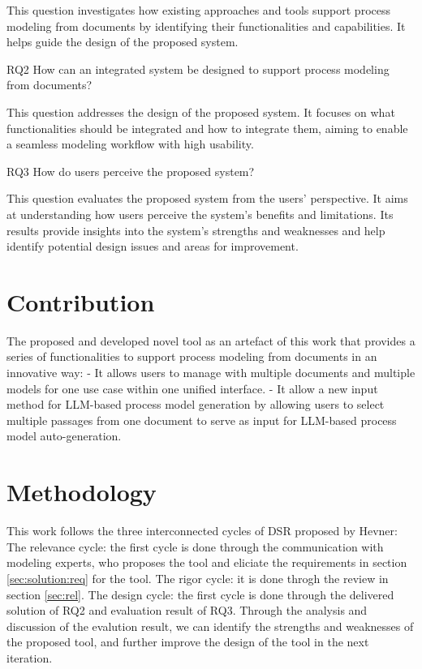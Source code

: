 This question investigates how existing approaches and tools support process modeling from documents by identifying their functionalities and capabilities. It helps guide the design of the proposed system.

RQ2 How can an integrated system be designed to support process modeling from documents?

This question addresses the design of the proposed system. It focuses on what functionalities should be integrated and how to integrate them, aiming to enable a seamless modeling workflow with high usability.

RQ3 How do users perceive the proposed system?

This question evaluates the proposed system from the users’ perspective. It aims at understanding how users perceive the system’s benefits and limitations. Its results provide insights into the system’s strengths and weaknesses and help identify potential design issues and areas for improvement.


\section{Contribution}
\label{sec:intro:con}
The proposed and developed novel tool as an artefact of this work that provides a series of functionalities to support process modeling from documents in an innovative way:
- It allows users to manage with multiple documents and multiple models for one use case within one unified interface.
- It allow a new input method for LLM-based process model generation by allowing users to select multiple passages from one document to serve as input for LLM-based process model auto-generation.
\section{Methodology}
\label{sec:intro:meth}

This work follows the three interconnected cycles of DSR\cite{hevner2007} proposed by Hevner:
The relevance cycle: the first cycle is done through the communication with modeling experts, who proposes the tool and eliciate the requirements in section \ref{sec:solution:req} for the tool. 
The rigor cycle: it is done throgh the review in section \ref{sec:rel}.
The design cycle: the first cycle is done through the delivered solution of RQ2 and evaluation result of RQ3. Through the analysis and discussion of the evalution result, we can identify the strengths and weaknesses of the proposed tool, and further improve the design of the tool in the next iteration.

